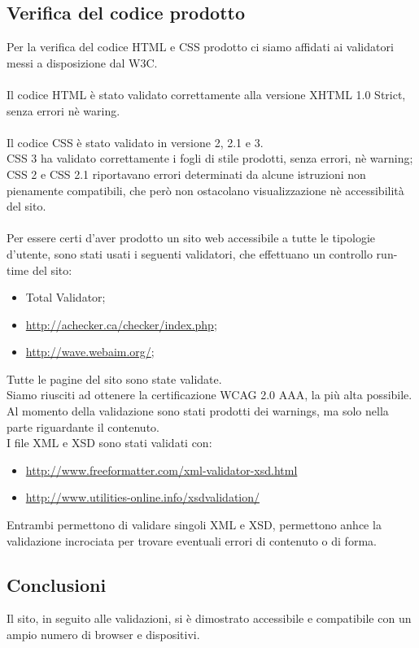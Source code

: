 {	\subsection{Verifica del codice prodotto}{
		Per la verifica del codice HTML e CSS prodotto ci siamo affidati ai validatori messi a disposizione dal W3C.\\
		\\
		Il codice HTML è stato validato correttamente alla versione XHTML 1.0 Strict, senza errori nè waring.\\
		\\
		Il codice CSS è stato validato in versione 2, 2.1 e 3.\\
		CSS 3 ha validato correttamente i fogli di stile prodotti, senza errori, nè warning; CSS 2 e CSS 2.1 riportavano errori determinati da alcune istruzioni non pienamente compatibili, che però non ostacolano visualizzazione nè accessibilità del sito. \\
		\\
		Per essere certi d'aver prodotto un sito web accessibile a tutte le tipologie d'utente, sono stati usati i seguenti validatori, che effettuano un controllo run-time del sito:
		\begin{itemize}\itemsep1pt
			\item Total Validator;
			\item \url{http://achecker.ca/checker/index.php};
			\item \url{http://wave.webaim.org/};
		\end{itemize}
		Tutte le pagine del sito sono state validate.\\
		Siamo riusciti ad ottenere la certificazione WCAG 2.0 AAA, la più alta possibile. Al momento della validazione sono stati prodotti dei warnings, ma solo nella parte riguardante il contenuto.\\
		I file XML e XSD sono stati validati con:
		\begin{itemize}\itemsep1pt
		\item \url{http://www.freeformatter.com/xml-validator-xsd.html}
		\item \url{http://www.utilities-online.info/xsdvalidation/}
		\end{itemize}
		Entrambi permettono di validare singoli XML e XSD, permettono anhce la validazione incrociata per trovare eventuali errori di contenuto o di forma.
	}
	\subsection{Conclusioni}
		Il sito, in seguito alle validazioni, si è dimostrato accessibile e compatibile con un ampio numero di browser e dispositivi.
}